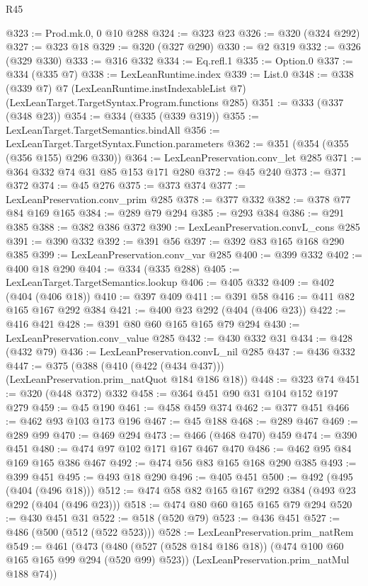 \begin{lexlean}{R45}
\begin{coremodule}
@323 := Prod.mk.{0, 0} @10 @288
@324 := @323 @23
@326 := @320 (@324 @292)
@327 := @323 @18
@329 := @320 (@327 @290)
@330 := @2 @319
@332 := @326 (@329 @330)
@333 := @316 @332
@334 := Eq.refl.{1}
@335 := Option.{0}
@337 := @334 (@335 @7)
@338 := LexLeanRuntime.index
@339 := List.{0}
@348 := @338
    (@339 @7)
    @7
    (LexLeanRuntime.instIndexableList @7)
    (LexLeanTarget.TargetSyntax.Program.functions @285)
@351 := @333 (@337 (@348 @23))
@354 := @334 (@335 (@339 @319))
@355 := LexLeanTarget.TargetSemantics.bindAll
@356 := LexLeanTarget.TargetSyntax.Function.parameters
@362 := @351 (@354 (@355 (@356 @155) @296 @330))
@364 := LexLeanPreservation.conv_let @285
@371 := @364 @332 @74 @31 @85 @153 @171 @280
@372 := @45 @240
@373 := @371 @372
@374 := @45 @276
@375 := @373 @374
@377 := LexLeanPreservation.conv_prim @285
@378 := @377 @332
@382 := @378 @77 @84 @169 @165
@384 := @289 @79 @294
@385 := @293 @384
@386 := @291 @385
@388 := @382 @386 @372
@390 := LexLeanPreservation.convL_cons @285
@391 := @390 @332
@392 := @391 @56
@397 := @392 @83 @165 @168 @290 @385
@399 := LexLeanPreservation.conv_var @285
@400 := @399 @332
@402 := @400 @18 @290
@404 := @334 (@335 @288)
@405 := LexLeanTarget.TargetSemantics.lookup
@406 := @405 @332
@409 := @402 (@404 (@406 @18))
@410 := @397 @409
@411 := @391 @58
@416 := @411 @82 @165 @167 @292 @384
@421 := @400 @23 @292 (@404 (@406 @23))
@422 := @416 @421
@428 := @391 @80 @60 @165 @165 @79 @294
@430 := LexLeanPreservation.conv_value @285
@432 := @430 @332 @31
@434 := @428 (@432 @79)
@436 := LexLeanPreservation.convL_nil @285
@437 := @436 @332
@447 := @375 (@388 (@410 (@422 (@434 @437))) (LexLeanPreservation.prim_natQuot @184 @186 @18))
@448 := @323 @74
@451 := @320 (@448 @372) @332
@458 := @364 @451 @90 @31 @104 @152 @197 @279
@459 := @45 @190
@461 := @458 @459 @374
@462 := @377 @451
@466 := @462 @93 @103 @173 @196
@467 := @45 @188
@468 := @289 @467
@469 := @289 @99
@470 := @469 @294
@473 := @466 (@468 @470) @459
@474 := @390 @451
@480 := @474 @97 @102 @171 @167 @467 @470
@486 := @462 @95 @84 @169 @165 @386 @467
@492 := @474 @56 @83 @165 @168 @290 @385
@493 := @399 @451
@495 := @493 @18 @290
@496 := @405 @451
@500 := @492 (@495 (@404 (@496 @18)))
@512 := @474 @58 @82 @165 @167 @292 @384 (@493 @23 @292 (@404 (@496 @23)))
@518 := @474 @80 @60 @165 @165 @79 @294
@520 := @430 @451 @31
@522 := @518 (@520 @79)
@523 := @436 @451
@527 := @486 (@500 (@512 (@522 @523)))
@528 := LexLeanPreservation.prim_natRem
@549 := @461
    (@473
      (@480 (@527 (@528 @184 @186 @18)) (@474 @100 @60 @165 @165 @99 @294 (@520 @99) @523))
      (LexLeanPreservation.prim_natMul @188 @74))

\end{coremodule}
\end{lexlean}
